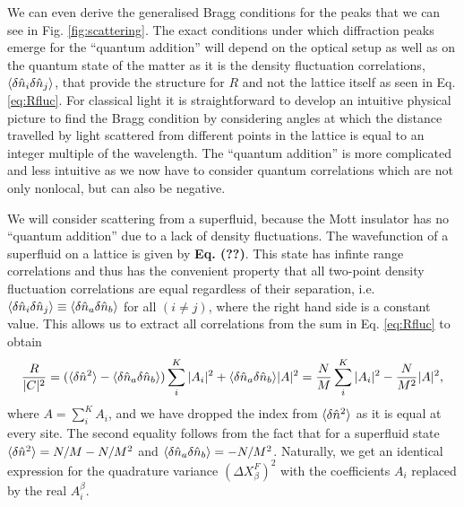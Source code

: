 We can even derive the generalised Bragg conditions for the peaks that
we can see in Fig. \ref{fig:scattering}. The exact conditions under
which diffraction peaks emerge for the ``quantum addition'' will
depend on the optical setup as well as on the quantum state of the
matter as it is the density fluctuation correlations,
$\langle \delta \hat{n}_i \delta \hat{n}_j \rangle$, that provide the structure for $R$ and
not the lattice itself as seen in Eq. \eqref{eq:Rfluc}. For classical
light it is straightforward to develop an intuitive physical picture
to find the Bragg condition by considering angles at which the
distance travelled by light scattered from different points in the
lattice is equal to an integer multiple of the wavelength. The
``quantum addition'' is more complicated and less intuitive as we now
have to consider quantum correlations which are not only nonlocal, but
can also be negative.

We will consider scattering from a superfluid, because the Mott
insulator has no ``quantum addition'' due to a lack of density
fluctuations. The wavefunction of a superfluid on a lattice is given
by \textbf{Eq. (??)}. This state has infinte range correlations and
thus has the convenient property that all two-point density
fluctuation correlations are equal regardless of their separation,
i.e.~$\langle \delta \hat{n}_i \delta \hat{n}_j \rangle \equiv \langle \delta \hat{n}_a \delta \hat{n}_b \rangle$
for all $(i \ne j)$, where the right hand side is a constant
value. This allows us to extract all correlations from the sum in
Eq. \eqref{eq:Rfluc} to obtain
\begin{equation}
  \label{eq:RSF}
  \frac{R}{|C|^2} = (\langle \delta \hat{n}^2 \rangle - \langle \delta \hat{n}_a \delta \hat{n}_b \rangle) \sum_i^K
  |A_i|^2 + \langle \delta \hat{n}_a \delta \hat{n}_b \rangle |A|^2 = \frac{N}{M} \sum_i^K
  |A_i|^2 - \frac{N}{M^2} |A|^2,
\end{equation}
where $A = \sum_i^K A_i$, and we have dropped the index from
$\langle \delta \hat{n}^2 \rangle$ as it is equal at every site. The second
equality follows from the fact that for a superfluid state
$\langle \delta \hat{n}^2 \rangle = N/M - N/M^2$ and
$\langle \delta \hat{n}_a \delta \hat{n}_b \rangle = -N/M^2$. Naturally, we get an identical
expression for the quadrature variance $(\Delta X^F_\beta)^2$ with the
coefficients $A_i$ replaced by the real $A_i^\beta$.

